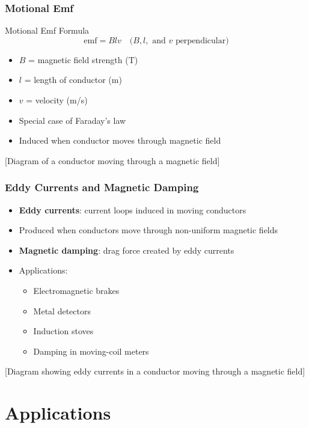 \documentclass{beamer}
\begin{document}
\begin{frame}
\frametitle{Motional Emf}
\begin{block}{Motional Emf Formula}
\begin{equation}
\text{emf} = Blv \quad \text{(}B, l, \text{ and } v \text{ perpendicular)}
\end{equation}
\end{block}
\begin{itemize}
    \item $B$ = magnetic field strength (T)
    \item $l$ = length of conductor (m)
    \item $v$ = velocity (m/s)
    \item Special case of Faraday's law
    \item Induced when conductor moves through magnetic field
\end{itemize}
\alert{[Diagram of a conductor moving through a magnetic field]}
\end{frame}

\begin{frame}
\frametitle{Eddy Currents and Magnetic Damping}
\begin{itemize}
    \item \textbf{Eddy currents}: current loops induced in moving conductors
    \item Produced when conductors move through non-uniform magnetic fields
    \item \textbf{Magnetic damping}: drag force created by eddy currents
    \item Applications:
    \begin{itemize}
        \item Electromagnetic brakes
        \item Metal detectors
        \item Induction stoves
        \item Damping in moving-coil meters
    \end{itemize}
\end{itemize}
\alert{[Diagram showing eddy currents in a conductor moving through a magnetic field]}
\end{frame}

\section{Applications}
\end{document}
